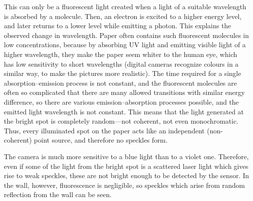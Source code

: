\begin{custom-simple}[Problem 19]
This can only be a fluorescent light created when a light of a suitable wavelength is absorbed by a molecule. Then, an electron is excited to a higher energy level, and later returns to a lower level while emitting a photon. This explains the observed change in wavelength. Paper often contains such fluorescent molecules in low concentrations, because by absorbing UV light and emitting visible light of a higher wavelength, they make the paper seem whiter to the human eye, which has low sensitivity to short wavelengths (digital cameras recognize colours in a similar way, to make the pictures more realistic). The time required for a single absorption–emission process is not constant, and the fluorescent molecules are often so complicated that there are many allowed transitions with similar energy difference, so there are various emission–absorption processes possible, and the emitted light wavelength is not constant. This means that the light generated at the bright spot is completely random—not coherent, not even monochromatic. Thus, every illuminated spot on the paper acts like an independent (non-coherent) point source, and therefore no speckles form.
\vspace{3mm}

The camera is much more sensitive to a blue light than to a violet one. Therefore, even if some of the light from the bright spot is a scattered laser light which gives rise to weak speckles, these are not bright enough to be detected by the sensor. In the wall, however, fluorescence is negligible, so speckles which arise from random reflection from the wall can be seen.
\end{custom-simple}